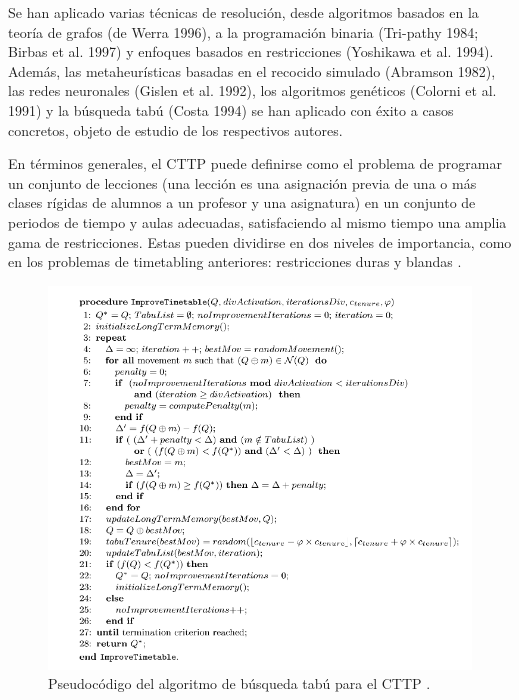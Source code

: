 Se han aplicado varias técnicas de resolución, desde
algoritmos basados en la teoría de grafos (de Werra 1996), a la programación binaria (Tri-pathy 1984; Birbas et al. 1997) y enfoques basados en restricciones (Yoshikawa et al. 1994). Además, las metaheurísticas basadas en el recocido simulado (Abramson 1982), las redes neuronales (Gislen et al. 1992), los algoritmos genéticos (Colorni et al. 1991) y la búsqueda tabú (Costa 1994) se han aplicado con éxito a casos concretos, objeto de estudio de los respectivos autores.\newline

En términos generales, el CTTP puede definirse como el problema de programar un conjunto de lecciones (una lección es una asignación previa de una o más clases rígidas de alumnos a un profesor y una asignatura) en un conjunto de periodos de tiempo y aulas adecuadas, satisfaciendo al mismo tiempo una amplia gama de restricciones. Estas pueden dividirse en dos niveles de importancia, como en los problemas de timetabling anteriores: restricciones duras y blandas \cite{carter}.\newpage

\begin{figure}[H]
    \centering
    \includegraphics[width=1\textwidth]{./imagenes/CTTP.png}
    \caption{Pseudocódigo del algoritmo de búsqueda tabú para el CTTP \cite{tabuSearch}.}
\end{figure}

\newpage

